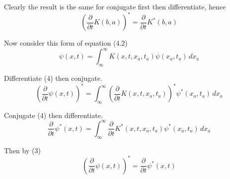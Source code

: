 \documentclass[12pt]{article}
\begin{document}
Clearly the result is the same for conjugate first then differentiate, hence
\begin{equation*}
\left(\frac{\partial}{\partial t}K(b,a)\right)^*
=\frac{\partial}{\partial t}K^*(b,a)
\tag{3}
\end{equation*}

Now consider this form of equation (4.2)
\begin{equation*}
\psi(x,t)=\int_{\infty}^\infty K(x,t,x_a,t_a)\psi(x_a,t_a)\,dx_a
\tag{4}
\end{equation*}

Differentiate (4) then conjugate.
\begin{equation*}
\left(\frac{\partial}{\partial t}\psi(x,t)\right)^*
=\int_{\infty}^\infty\left(\frac{\partial}{\partial t}K(x,t,x_a,t_a)\right)^*\psi^*(x_a,t_a)\,dx_a
\end{equation*}

Conjugate (4) then differentiate.
\begin{equation*}
\frac{\partial}{\partial t}\psi^*(x,t)
=\int_{\infty}^\infty\frac{\partial}{\partial t}K^*(x,t,x_a,t_a)\psi^*(x_a,t_a)\,dx_a
\end{equation*}

Then by (3)
\begin{equation*}
\left(\frac{\partial}{\partial t}\psi(x,t)\right)^*=\frac{\partial}{\partial t}\psi^*(x,t)
\end{equation*}
\end{document}
